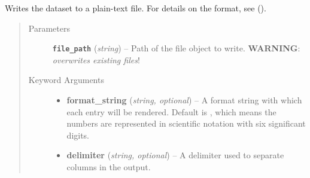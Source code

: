 \documentclass[a4paper,10pt,english]{sphinxmanual}
\begin{document}
\begin{fulllineitems}
\begin{fulllineitems}
\begin{quote}
\begin{description}
\end{description}\end{quote}

\end{fulllineitems}


\begin{fulllineitems}
\label{index:kafe.dataset.Dataset.write_formatted}
Writes the dataset to a plain-text file. For details on the format, see
{\hyperref[index:kafe.dataset.Dataset.read_from_file]{\emph{}}} ().
\begin{quote}\begin{description}
\item[{Parameters}] \leavevmode
\textbf{\texttt{file\_path}} (\emph{string}) -- Path of the file object to write. \textbf{WARNING}: \emph{overwrites existing
files}!

\item[{Keyword Arguments}] \leavevmode\begin{itemize}
\item {} 
\textbf{format\_string} (\emph{string, optional}) --
A format string with which each entry will be rendered. Default is
, which means the numbers are represented in scientific
notation with six significant digits.

\item {} 
\textbf{delimiter} (\emph{string, optional}) --
A delimiter used to separate columns in the output.

\end{itemize}

\end{description}\end{quote}

\end{fulllineitems}


\end{fulllineitems}

\end{document}
